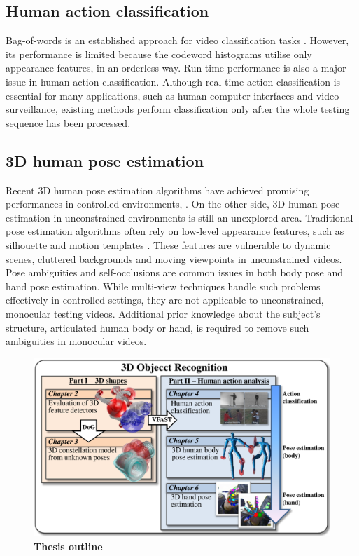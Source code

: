\subsection{Human action classification}


Bag-of-words is an established approach for video classification tasks \cite{Schuldt2004, Dollar2005, Riemenschneider2009, Niebles2008, Wong2007}. However, its performance is limited because the codeword histograms utilise only appearance features, in an orderless way. Run-time performance is also a major issue in human action classification. Although real-time action classification is essential for many applications, such as human-computer interfaces and video surveillance, existing methods perform classification only after the whole testing sequence has been processed. 

\subsection{3D human pose estimation} 


Recent 3D human pose estimation algorithms have achieved promising performances in controlled environments, \eg \cite{Rogez2012, Pons-Moll2011, Sigal2012}. On the other side, 3D human pose estimation in unconstrained environments is still an unexplored area.       
Traditional pose estimation algorithms often rely on low-level appearance features, such as silhouette and motion templates \cite{Bissacco2007, Rogez2012, Ionescu2011, Navaratnam2006}. These features are vulnerable to dynamic scenes, cluttered backgrounds and moving viewpoints in unconstrained videos. 
Pose ambiguities and self-occlusions are common issues in both body pose and hand pose estimation. While multi-view techniques handle such problems effectively in controlled settings, they are not applicable to unconstrained, monocular testing videos. Additional prior knowledge about the subject's structure, \eg articulated human body or hand, is required to remove such ambiguities in monocular videos. 

\begin{figure}[ht]
\centering
\includegraphics[width=1\linewidth]{./fig/intro/intro.pdf}
\caption{\textbf{Thesis outline}} 
\label{fig/intro/outline}
\end{figure}

